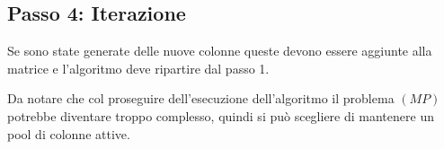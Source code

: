 \subsection{Passo 4: Iterazione}

Se sono state generate delle nuove colonne queste devono essere aggiunte alla matrice e l'algoritmo deve ripartire dal passo 1.

Da notare che col proseguire dell'esecuzione dell'algoritmo il problema $(MP)$ potrebbe diventare troppo complesso, quindi si può scegliere di mantenere un pool di colonne attive.



































